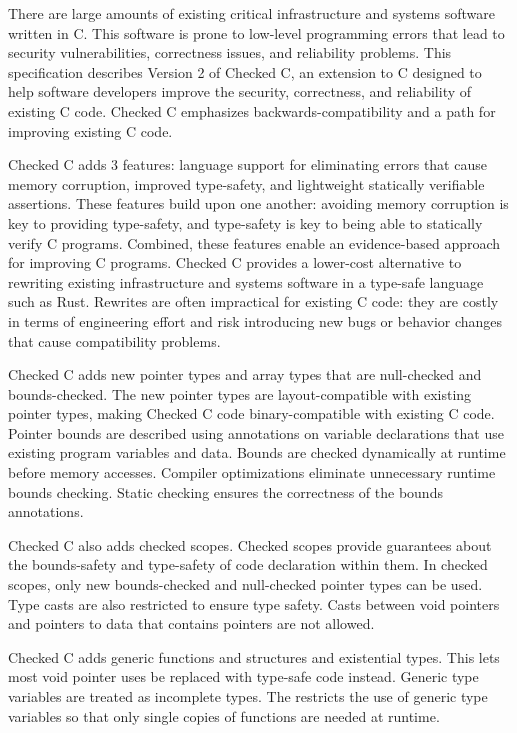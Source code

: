 
\parbox{5.5in}{
There are large amounts of existing critical infrastructure and
systems software written in C. This software is prone to
low-level programming errors that lead to security vulnerabilities,
correctness issues, and reliability problems.  This specification describes
Version 2 of Checked C, an extension to C designed to help software
developers improve the security, correctness, and reliability of existing
C code.  Checked C emphasizes backwards-compatibility and a
path for improving existing C code.
}

\vspace{11pt}

\parbox{5.5in}{Checked C adds 3 features: language support for
eliminating errors that cause memory corruption,
improved type-safety, and lightweight statically verifiable assertions.
These features build upon one another: avoiding memory corruption
is key to providing type-safety, and type-safety is key to being able
to statically verify C programs.  Combined, these features enable an
evidence-based approach for improving C programs.  Checked C provides a
lower-cost alternative to rewriting existing infrastructure and systems software in a type-safe
language such as Rust. Rewrites are often impractical for existing
C code: they are costly in terms of engineering effort and risk introducing
new bugs or behavior changes that cause compatibility problems.}

\vspace{11pt}

\parbox{5.5in}{
Checked C adds new pointer types and array types that are
null-checked and bounds-checked. The new pointer types
are layout-compatible with existing pointer
types, making Checked C code binary-compatible with existing C code.
Pointer bounds are described using annotations on variable
declarations that use existing program variables and data.
Bounds are checked dynamically at runtime before memory accesses.
Compiler optimizations eliminate unnecessary runtime bounds checking.
Static checking ensures the correctness of the bounds annotations.}

\vspace{11pt}

\parbox{5.5in}{Checked C also adds checked scopes. Checked scopes
provide guarantees about the bounds-safety and type-safety of code
declaration within them. In checked
scopes, only new bounds-checked and null-checked pointer types
can be used.  Type casts are also restricted to ensure type
safety.  Casts between void pointers and pointers to
 data that contains pointers are not allowed.}

\vspace{11pt}
\parbox{5.5in}{Checked C adds
generic functions and structures and existential types.
This lets most void pointer uses be replaced with type-safe code
instead.  Generic type variables are treated as incomplete types.
The restricts the use of generic type variables so that only 
single copies of functions are needed at runtime.
}

